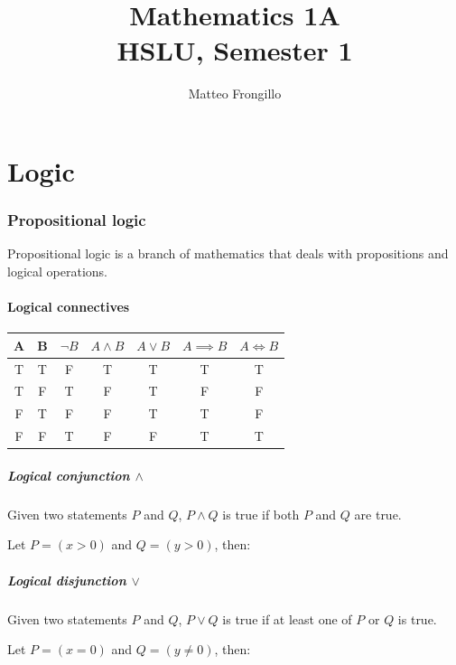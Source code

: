 \documentclass{article}
\title{\textbf{Mathematics 1A \\ HSLU, Semester 1}}
\author{Matteo Frongillo}
\begin{document}
\maketitle
\tableofcontents
\pagebreak

\part{Logic}
\section{Propositional logic}
Propositional logic is a branch of mathematics that deals with propositions and logical operations.

\subsection{Logical connectives}
\begin{center}
    \begin{tabular}{|c|c|c|c|c|c|c|}
        \hline \rule{0pt}{13pt}
        A & B & $\lnot B$ & $A \land B$ & $A \lor B$ & $A \implies B$ & $A \Leftrightarrow B$ \\
        \hline \rule{0pt}{13pt} T & T & F & T & T & T & T \\
        \hline \rule{0pt}{13pt} T & F & T & F & T & F & F \\
        \hline \rule{0pt}{13pt} F & T & F & F & T & T & F \\
        \hline \rule{0pt}{13pt} F & F & T & F & F & T & T \\
        \hline
    \end{tabular}
\end{center}

\subsubsection{Logical conjunction $\land$}
Given two statements $P$ and $Q$, $P \land Q$ is true if both $P$ and $Q$ are true.

Let $P=(x>0)$ and $Q=(y>0)$, then:

\subsubsection{Logical disjunction $\lor$}
Given two statements $P$ and $Q$, $P \lor Q$ is true if at least one of $P$ or $Q$ is true.

Let $P=(x=0)$ and $Q=(y \neq 0)$, then:
\end{document}
